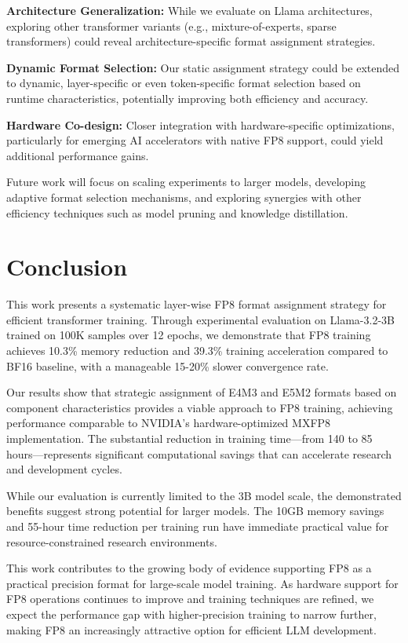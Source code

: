 \documentclass[conference]{IEEEtran}
\begin{document}
\textbf{Architecture Generalization:} While we evaluate on Llama architectures, exploring other transformer variants (e.g., mixture-of-experts, sparse transformers) could reveal architecture-specific format assignment strategies.

\textbf{Dynamic Format Selection:} Our static assignment strategy could be extended to dynamic, layer-specific or even token-specific format selection based on runtime characteristics, potentially improving both efficiency and accuracy.

\textbf{Hardware Co-design:} Closer integration with hardware-specific optimizations, particularly for emerging AI accelerators with native FP8 support, could yield additional performance gains.

Future work will focus on scaling experiments to larger models, developing adaptive format selection mechanisms, and exploring synergies with other efficiency techniques such as model pruning and knowledge distillation.
\section{Conclusion}

This work presents a systematic layer-wise FP8 format assignment strategy for efficient transformer training. Through experimental evaluation on Llama-3.2-3B trained on 100K samples over 12 epochs, we demonstrate that FP8 training achieves 10.3\% memory reduction and 39.3\% training acceleration compared to BF16 baseline, with a manageable 15-20\% slower convergence rate.

Our results show that strategic assignment of E4M3 and E5M2 formats based on component characteristics provides a viable approach to FP8 training, achieving performance comparable to NVIDIA's hardware-optimized MXFP8 implementation. The substantial reduction in training time—from 140 to 85 hours—represents significant computational savings that can accelerate research and development cycles.

While our evaluation is currently limited to the 3B model scale, the demonstrated benefits suggest strong potential for larger models. The 10GB memory savings and 55-hour time reduction per training run have immediate practical value for resource-constrained research environments.

This work contributes to the growing body of evidence supporting FP8 as a practical precision format for large-scale model training. As hardware support for FP8 operations continues to improve and training techniques are refined, we expect the performance gap with higher-precision training to narrow further, making FP8 an increasingly attractive option for efficient LLM development.
\end{document}
